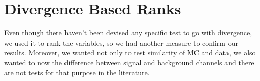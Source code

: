 \section{\ren Divergence Based Ranks}
Even though there haven't been devised any specific test to go with \ren divergence, we used it to rank the variables, so we had another measure to confirm our results. Moreover, we wanted not only to test similarity of MC and data, we also wanted to now the difference between signal and background channels and there are not tests for that purpose in the literature.


